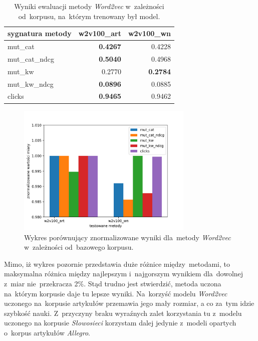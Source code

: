 \documentclass[pl]{minipw} %
\begin{document}
\begin{table}[H]
	\centering
	\begin{tabular}{lrr}
		\hline
		sygnatura metody &   w2v100\_art &   w2v100\_wn \\
		\hline
		mut\_cat      &       \textbf{0.4267} &      0.4228 \\
		mut\_cat\_ndcg &       \textbf{0.5040}  &      0.4968 \\
		mut\_kw       &       0.2770  &      \textbf{0.2784} \\
		mut\_kw\_ndcg  &       \textbf{0.0896} &      0.0885 \\
		clicks       &       \textbf{0.9465} &      0.9462 \\
		\hline
	\end{tabular}
	\caption{Wyniki ewaluacji metody \textit{Word2vec} w~zależności od~korpusu, na~którym trenowany był model.}
\end{table}

\begin{figure}[H]
	\centering
	\includegraphics[width=0.75\textwidth]{img/results/w2v100_art_w2v100_wn_.png}
\caption{Wykres porównujący znormalizowane wyniki dla~metody \textit{Word2vec} w~zależności od~bazowego korpusu.}
\end{figure}

Mimo, iż wykres pozornie przedstawia duże różnice między~metodami, to maksymalna różnica między najlepszym i~najgorszym wynikiem dla~dowolnej z~miar nie~przekracza 2\%. Stąd trudno jest stwierdzić, metoda uczona na~którym korpusie daje tu lepsze wyniki. Na~korzyść modelu \textit{Word2vec} uczonego na~korpusie artykułów przemawia jego mały rozmiar, a co za~tym idzie szybkość nauki. Z~przyczyny braku wyraźnych zalet korzystania tu z~modelu uczonego na korpusie \textit{Słowosieci} korzystam dalej jedynie z~modeli opartych o~korpus artykułów \textit{Allegro}.
\end{document}
